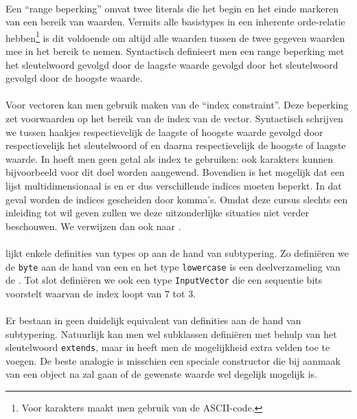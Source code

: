 \paragraph{}
Een ``range beperking'' omvat twee literals die het begin en het einde markeren van een bereik van waarden. Vermits alle basistypes in \tvhdl{} een inherente orde-relatie hebben\footnote{Voor karakters maakt men gebruik van de ASCII-code.} is dit voldoende om altijd alle waarden tussen de twee gegeven waarden mee in het bereik te nemen. Syntactisch definieert men een range beperking met het sleutelwoord  gevolgd door de laagste waarde gevolgd door het sleutelwoord  gevolgd door de hoogste waarde.

\paragraph{}
Voor vectoren kan men gebruik maken van de ``index constraint''. Deze beperking zet voorwaarden op het bereik van de index van de vector. Syntactisch schrijven we tussen haakjes respectievelijk de laagste of hoogste waarde gevolgd door respectievelijk het sleutelwoord  of  en daarna respectievelijk de hoogste of laagste waarde. In \tvhdl{} hoeft men geen getal als index te gebruiken: ook karakters kunnen bijvoorbeeld voor dit doel worden aangewend. Bovendien is het mogelijk dat een lijst multidimensionaal is en er dus verschillende indices moeten beperkt. In dat geval worden de indices gescheiden door komma's. Omdat deze cursus slechts een inleiding tot \tvhdl{} wil geven zullen we deze uitzonderlijke situaties niet verder beschouwen. We verwijzen dan ook naar \cite{hardi00}.

\paragraph{}
 lijkt enkele definities van types op aan de hand van subtypering. Zo defini\"eren we de \texttt{byte} aan de hand van een  en het type \texttt{lowercase} is een deelverzameling van de . Tot slot defini\"eren we ook een type \texttt{InputVector} die een sequentie bits voorstelt waarvan de index loopt van $7$ tot $3$.


\paragraph{}
Er bestaan in \tjava{} geen duidelijk equivalent van definities aan de hand van subtypering. Natuurlijk kan men wel subklassen defini\"eren met behulp van het sleutelwoord \texttt{extends}, maar in \tjava{} heeft men de mogelijkheid extra velden toe te voegen. De beste analogie is misschien een speciale constructor die bij aanmaak van een object na zal gaan of de gewenste waarde wel degelijk mogelijk is.

